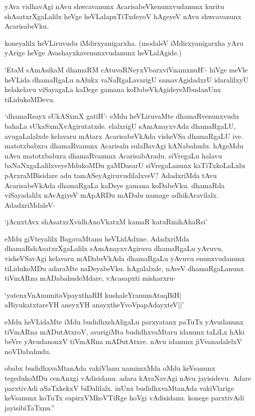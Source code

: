 yAva vidhavAgi nAvu shwcavanunx AcarisabeVkenunxvudanunx kuritu shAsatxrXgaLalilx heVge heVLalapxTiTxdeyoV hAgeyeV nAvu shwcavanunx AcarisabeVku.

koneyalilx heVLiruvudu iMdirxyanigarxha. (modaleV iMdirxyanigarxha yAru yArige heVge Avashayxkavenunxvudanunx heVLalAgide.) 

`EtaM sAmAsikaM dhamaRM cAtuvaRNeyxV\s barxviVnamxnuH'- hiVge meVle heVLida dhamaRgaLu nAlukx vaNaRgaLavarigU samavAgidadxrU idaralilxyU kelakelavu viSayagaLa kaDege gamana koDabeVkAgideyeMbudanUnx tiLidukoMDevu.

`dhamaRsayx sUkASxmX gatiH'- eMdu heVLiruvaMte dhamaRvenunxvudu bahaLa sUkaSxmXvAgirutatxde. elalxrigU sAmAnayxvAda dhamaRgaLU, avugaLalalxde kelavaru mAtarx AcarisabeVkAda visheVSa dhamaRgaLU ive. matotxbabxra dhamaRvanunx Acarisalu sulaBavAgi kANabahudu. hAgeMdu nAvu matotxbabxra dhamaRvanunx AcarisabAradu. siVregaLu halavu baNaNxgaLalilxveyeMdukoMDu gaMDasarU siVregaLanunx kaTiTxkoLaLxlu pArxraMBisidare adu tamASeyAgiruvudilalxveV? AdadxriMda tAvu AcarisabeVkAda dhamaRgaLa kaDeye gamana koDabeVku. dhamaRda viSayadalilx nAvAgiyeV mApARDu mADalu namage adhikAravilalx. AdadxriMdaleV-

\begin{shloka}
`jAcnxtAvx shAsatxrXvidhAnoVkatxM kamaR katuRmihAhaRsi'
\end{shloka} 

eMdu giVteyalilx BagavaMtanu heVLidAdxne. AdadxriMda dhamaRshAsatxrXgaLalilx sAmAnayxvAgiruva dhamaRgaLu yAvuvu, visheVSavAgi kelavaru mADabeVkAda dhamaRgaLu yAvuvu enunxvudanunx tiLidukoMDu adaraMte naDeyabeVku. hAgalalxde, nAveV dhamaRgaLanunx tiVmARna mADabahudeMdare, vAcasapxti misharxru-

\begin{shloka}
`yatenxVnAnumitoVpayxthaRH kushaleYranumAtaqBiH|\\
aBiyukatxtareYH aneyxYH anayxtheYvoVpapAdayxteV||'
\end{shloka}

\noindent eMdu heVLidaMte iMdu budidhxshAligaLu parxyatanx paTuTx yAvudanunx tiVmARna mADutAtxroV, avarigiMta budidhxvaMtaru idanunx taLiLx hAki beVre yAvudanonxV tiVmARna mADutAtxre. nAvu idanunx jiVvanadalelxV noVDabahudu.

obabx budidhxvaMtanAda vakiVlanu namimxMda oMdu keVsanunx tegedukoMDu cenAnxgi vAdisidanu. adara kAraNavAgi nAvu jayisidevu. Adare parxtivAdi aSaTxkekxV biDalilalx. inUnx budidhxvaMtanAda vakiVlarige keVsanunx koTuTx supirxVMkoVTiRge hoVgi vAdisidanu. konege parxtivAdi jayisibiTaTxnu.''

